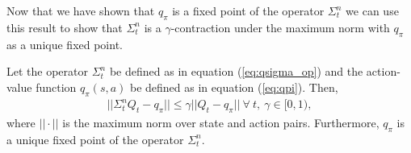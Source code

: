 Now that we have shown that $q_\pi$ is a fixed point of the operator $\Sigma^n_t$ we can use this result to show that $\Sigma^n_t$ is a $\gamma$-contraction under the maximum norm with $q_\pi$ as a unique fixed point.

\begin{lemma}
\label{lem:contraction}
Let the operator $\Sigma^n_t$ be defined as in equation (\ref{eq:qsigma_op}) and the action-value function $q_\pi(s, a)$ be defined as in equation (\ref{eq:qpi}).
Then, 
\begin{align}
|| \Sigma^n_t Q_t - q_\pi || \leq \gamma || Q_t - q_\pi || \ \forall \ t, \ \gamma\in[0,1),
\end{align}
where $|| \cdot ||$ is the maximum norm over state and action pairs. 
Furthermore, $q_\pi$ is a unique fixed point of the operator $\Sigma^n_t$.
\end{lemma}


